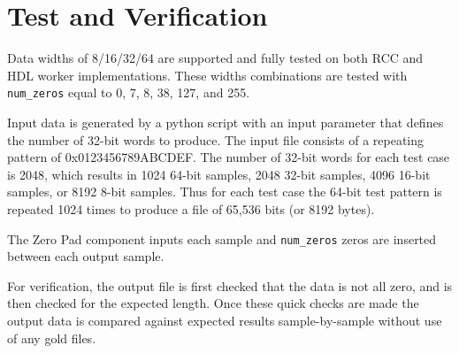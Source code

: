 \documentclass{article}
\def\Comp{Zero Pad}
\begin{document}
\section*{Test and Verification}
\begin{flushleft}
	Data widths of 8/16/32/64 are supported and fully tested on both RCC and HDL worker implementations. These widths combinations are tested with \verb+num_zeros+ equal to 0, 7, 8, 38, 127, and 255.\medskip

	Input data is generated by a python script with an input parameter that defines the number of 32-bit words to produce. The input file consists of a repeating pattern of 0x0123456789ABCDEF. The number of 32-bit words for each test case is 2048, which results in 1024 64-bit samples, 2048 32-bit samples, 4096 16-bit samples, or 8192 8-bit samples. Thus for each test case the 64-bit test pattern is repeated 1024 times to produce a file of 65,536 bits (or 8192 bytes).\medskip

	The \Comp{} component inputs each sample and \verb+num_zeros+ zeros are inserted between each output sample.\medskip

	For verification, the output file is first checked that the data is not all zero, and is then checked for the expected length. Once these quick checks are made the output data is compared against expected results sample-by-sample without use of any gold files.
\end{flushleft}
\end{document}
